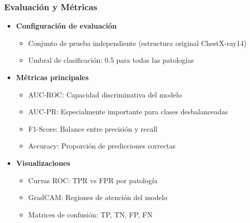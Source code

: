\begin{frame}
\frametitle{Evaluación y Métricas}
\begin{itemize}
    \item \textbf{Configuración de evaluación}
    \begin{itemize}
        \item Conjunto de prueba independiente (estructura original ChestX-ray14)
        \item Umbral de clasificación: 0.5 para todas las patologías
    \end{itemize}
    \item \textbf{Métricas principales}
    \begin{itemize}
        \item AUC-ROC: Capacidad discriminativa del modelo
        \item AUC-PR: Especialmente importante para clases desbalanceadas
        \item F1-Score: Balance entre precisión y recall
        \item Accuracy: Proporción de predicciones correctas
    \end{itemize}
    \item \textbf{Visualizaciones}
    \begin{itemize}
        \item Curvas ROC: TPR vs FPR por patología
        \item GradCAM: Regiones de atención del modelo
        \item Matrices de confusión: TP, TN, FP, FN
    \end{itemize}
\end{itemize}
\end{frame}
